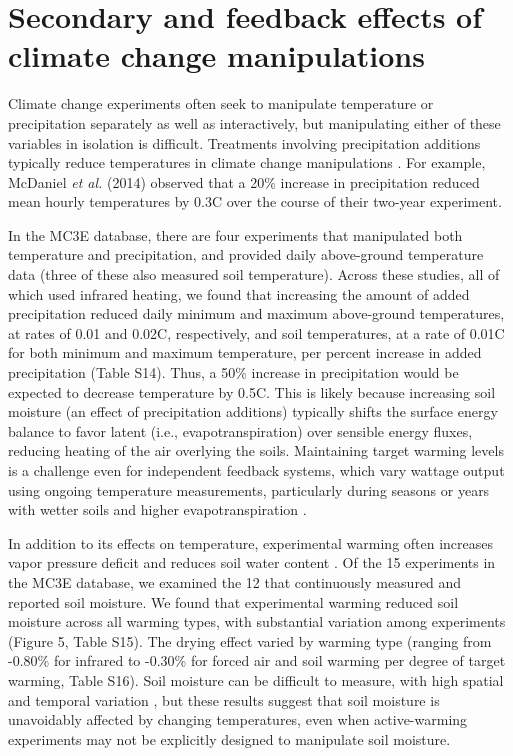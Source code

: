 \documentclass{article}
\begin{document}
\section* {Secondary and feedback effects of climate change manipulations} 
Climate change experiments often seek to manipulate temperature or precipitation separately as well as interactively, but manipulating either of these variables in isolation is difficult. Treatments involving precipitation additions typically reduce temperatures in climate change manipulations \citep{sherry2007,rollinson2012,mcdaniel2014}. For example, McDaniel \emph{et al.} (2014) observed that a 20\% increase in precipitation reduced mean hourly temperatures by 0.3\degree C over the course of their two-year experiment. 
\par In the MC3E database, there are four experiments that manipulated both temperature and precipitation, and provided daily above-ground temperature data (three of these also measured soil temperature). Across these studies, all of which used infrared heating, we found that increasing the amount of added precipitation reduced daily minimum and maximum above-ground temperatures, at rates of 0.01 and 0.02\degree C, respectively, and soil temperatures, at a rate of 0.01\degree C for both minimum and maximum temperature, per percent increase in added precipitation (Table S14). Thus, a 50\% increase in precipitation would be expected to decrease temperature by 0.5\degree C.
This is likely because increasing soil moisture (an effect of precipitation additions) typically shifts the surface energy balance to favor latent (i.e., evapotranspiration) over sensible energy fluxes, reducing heating of the air overlying the soils. Maintaining target warming levels is a challenge even for independent feedback systems, which vary wattage output using ongoing temperature measurements, particularly during seasons or years with wetter soils and higher evapotranspiration \citep{rich2015}.
\par In addition to its effects on temperature, experimental warming often increases vapor pressure deficit and reduces soil water content \citep[e.g.,][]{harte1995b,sherry2007,morin2010,pelini2014,templer2016}. Of the 15 experiments in the MC3E database, we examined the 12 that continuously measured and reported soil moisture. We found that experimental warming reduced soil moisture across all warming types, with substantial variation among experiments (Figure 5, Table S15). The drying effect varied by warming type (ranging from -0.80\% for infrared to -0.30\% for forced air and soil warming per degree of target warming, Table S16). Soil moisture can be difficult to measure, with high spatial and temporal variation \citep{famiglietti1999,teuling2005}, but these results suggest that soil moisture is unavoidably affected by changing temperatures, even when active-warming experiments may not be explicitly designed to manipulate soil moisture.
\end{document}

